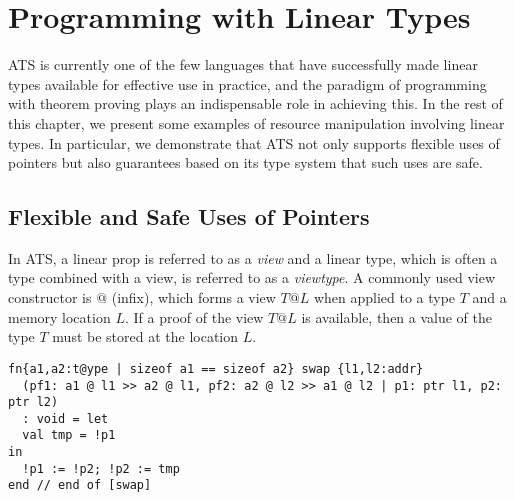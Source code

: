 \chapter{Programming with Linear Types}

ATS is currently one of the few languages that have successfully made
linear types available for effective use in practice, and the paradigm of
programming with theorem proving plays an indispensable role in achieving
this.  In the rest of this chapter, we present some examples of resource
manipulation involving linear types. In particular, we demonstrate that ATS
not only supports flexible uses of pointers but also guarantees based on
its type system that such uses are safe.

\section{Flexible and Safe Uses of Pointers}
In ATS, a linear prop is referred to as a {\it view} and a linear type,
which is often a type combined with a view, is referred to as a {\it
viewtype}. A commonly used view constructor is $@$ (infix), which
forms a view $T@L$ when applied to a type $T$ and a memory location $L$. If
a proof of the view $T@L$ is available, then a value of the type $T$ must
be stored at the location $L$.

\begin{verbatim}
fn{a1,a2:t@ype | sizeof a1 == sizeof a2} swap {l1,l2:addr}
  (pf1: a1 @ l1 >> a2 @ l1, pf2: a2 @ l2 >> a1 @ l2 | p1: ptr l1, p2: ptr l2)
  : void = let
  val tmp = !p1
in
  !p1 := !p2; !p2 := tmp
end // end of [swap]
\end{verbatim}


